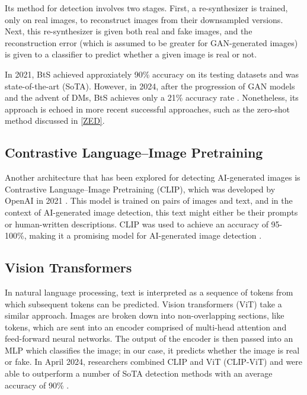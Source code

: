 \documentclass{article} %
\begin{document}
Its method for detection involves two stages. First, a re-synthesizer is trained, only on real images, to reconstruct images from their downsampled versions. Next, this re-synthesizer is given both real and fake images, and the reconstruction error (which is assumed to be greater for GAN-generated images) is given to a classifier to predict whether a given image is real or not.

In 2021, BtS achieved approxiately 90\% accuracy on its testing datasets and was state-of-the-art (SoTA). However, in 2024, after the progression of GAN models and the advent of DMs, BtS achieves only a 21\% accuracy rate \citep{li2024adversarialaiartunderstandinggeneration}. Nonetheless, its approach is echoed in more recent successful approaches, such as the zero-shot method discussed in \ref{ZED}.

\subsection{Contrastive Language–Image Pretraining}

Another architecture that has been explored for detecting AI-generated images is Contrastive Language–Image Pretraining (CLIP), which was developed by OpenAI in 2021 \citep{radford2021learningtransferablevisualmodels}. This model is trained on pairs of images and text, and in the context of AI-generated image detection, this text might either be their prompts or human-written descriptions. CLIP was used to achieve an accuracy of 95-100\%, making it a promising model for AI-generated image detection \citep{moskowitz2024detectingaigeneratedimagesclip}.

\subsection{Vision Transformers}

In natural language processing, text is interpreted as a sequence of tokens from which subsequent tokens can be predicted. Vision transformers (ViT) take a similar approach. Images are broken down into non-overlapping sections, like tokens, which are sent into an encoder comprised of multi-head attention and feed-forward neural networks. The output of the encoder is then passed into an MLP which classifies the image; in our case, it predicts whether the image is real or fake. In April 2024, researchers combined CLIP and ViT (CLIP-ViT) and were able to outperform a number of SoTA detection methods with an average accuracy of 90\% \citep{cozzolino2024raisingbaraigeneratedimage}.
\end{document}
